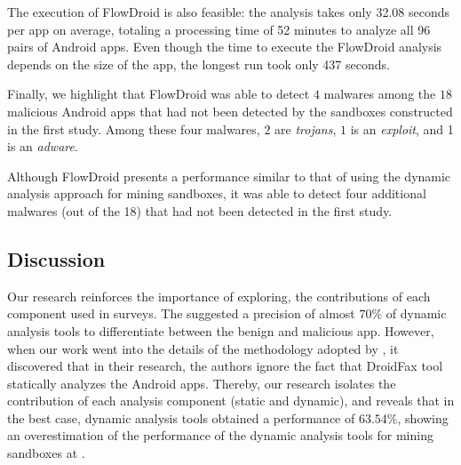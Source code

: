 The execution of FlowDroid is also feasible: the analysis takes only
32.08 seconds per app on average, totaling a processing time of 52
minutes to analyze all 96 pairs of Android apps.
Even though the time to execute the FlowDroid analysis depends on the size
of the app, the longest run took only 437 seconds. 

Finally, we highlight that FlowDroid was able to detect $4$ malwares among the $18$ malicious Android apps that had not
been detected by the sandboxes constructed in the first study. Among these
four malwares, $2$ are \emph{trojans}, $1$ is an \emph{exploit}, and 1 is an \emph{adware}.

\begin{finding}
  Although FlowDroid presents a performance similar
  to that of using the dynamic analysis approach for mining sandboxes,
  it was able to detect four additional malwares (out of the
  18) that had not been detected in the first study. 
\end{finding}



\subsection{Discussion}\label{sec:discussion}

Our research reinforces the importance of exploring, the contributions of each component used in surveys. The \blls suggested a precision of almost $70\%$ of dynamic analysis tools to differentiate between  the benign and malicious app. However, when our work went into the details of the methodology adopted by \blls, it discovered that in their research, the authors ignore the fact that DroidFax tool statically analyzes the Android apps. Thereby, our research isolates the contribution of each analysis component (static and dynamic), and reveals that in the best case, dynamic analysis tools obtained a performance of $63.54\%$, showing an overestimation of the performance of the dynamic analysis tools for mining sandboxes at \blls.

